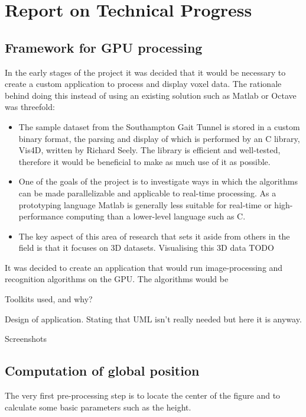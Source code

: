 \section{Report on Technical Progress}

\subsection{Framework for GPU processing}

In the early stages of the project it was decided that it would be necessary to create a custom application to process and display voxel data.
The rationale behind doing this instead of using an existing solution such as Matlab or Octave was threefold:

\begin{itemize}
	\item The sample dataset from the Southampton Gait Tunnel is stored in a custom binary format, the parsing and display of which is
		performed by an C library, Vis4D, written by Richard Seely.
		The library is efficient and well-tested, therefore it would be beneficial to make as much use of it as possible.
	\item One of the goals of the project is to investigate ways in which the algorithms can be made parallelizable and applicable to real-time processing.
		As a prototyping language Matlab is generally less suitable for real-time or high-performance computing than a lower-level language such as C.
	\item The key aspect of this area of research that sets it aside from others in the field is that it focuses on 3D datasets.
		Visualising this 3D data TODO
\end{itemize}

It was decided to create an application that would run image-processing and recognition algorithms on the GPU.
The algorithms would be 


Toolkits used, and why?

Design of application.  Stating that UML isn't really needed but here it is anyway.

Screenshots

\subsection{Computation of global position}\label{LocatingCenter}

The very first pre-processing step is to locate the center of the figure and to calculate some basic parameters such as the height.

